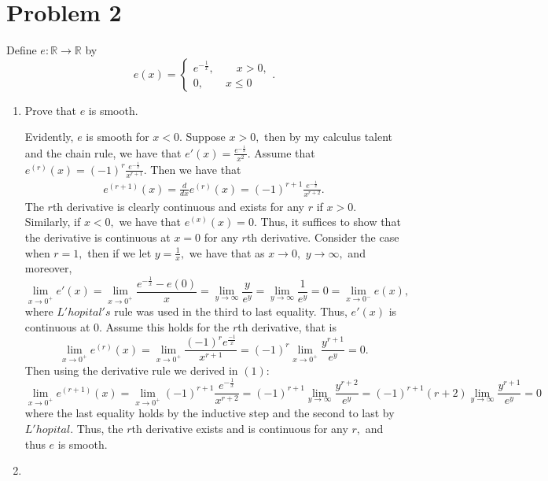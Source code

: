 \documentclass[11pt]{article}
\newcommand{\bbR}{\mathbb{R}}
\begin{document}
\newpage
\section*{Problem 2}
\begin{problem}
    Define $e: \bbR \to \bbR$ by 
    \[e(x) = \begin{cases}
        e^{-\frac{1}{x}}, \qquad x>0,\\
        0, \qquad x\leq 0
    \end{cases}.\]
\end{problem}
\begin{enumerate}
    \item Prove that $e$ is smooth.
    \begin{solution}
        Evidently, $e$ is smooth for $x<0.$ Suppose $x>0,$ then by my calculus talent and the chain rule, we have that $e'(x) = \frac{e^{-\frac{1}{x}}}{x^2}.$ Assume that $e^{(r)}(x) = (-1)^{r}\frac{e^{-\frac{1}{x}}}{x^{r+1}}.$ Then we have that \begin{align}
            e^{(r+1)}(x) = \frac{d}{dx}e^{(r)}(x) = (-1)^{r+1}\frac{e^{-\frac{1}{x}}}{x^{r+2}}.
        \end{align} The $r$th derivative is clearly continuous and exists for any $r$ if $x>0.$ Similarly, if $x<0,$ we have that $e^{(x)}(x) = 0.$ Thus, it suffices to show that the derivative is continuous at $x= 0$ for any $r$th derivative.
        Consider the case when $r = 1,$ then if we let $y = \frac{1}{x},$ we have that as $x\to 0,$ $y\to \infty,$ and moreover, \[\lim_{x\to 0^+}e'(x) = \lim_{x\to 0^+}\frac{e^{-\frac{1}{x}} - e(0)}{x} = \lim_{y\to \infty}\frac{y}{e^{y}} = \lim_{y\to \infty} \frac{1}{e^{y}} = 0= \lim_{x\to 0^-}e(x),\] where $L'hopital's$ rule was used in the third to last equality. Thus, $e'(x)$ is continuous at $0.$ Assume this holds for the $r$th derivative, that is 
        \[\lim_{x\to 0^+}e^{(r)}(x) = \lim_{x\to 0^+}\frac{(-1)^r e^{\frac{-1}{x}}}{x^{r+1}} = (-1)^r\lim_{x\to 0^+}\frac{y^{r+1}}{e^y} = 0.\] Then using the derivative rule we derived in $(1):$
        \[\lim_{x\to 0^+}e^{(r+1)}(x) = \lim_{x\to 0^+}(-1)^{r+1}\frac{e^{-\frac{1}{x}}}{x^{r+2}} = (-1)^{r+1}\lim_{y\to \infty}\frac{y^{r+2}}{e^y} = (-1)^{r+1}(r+2)\lim_{y\to \infty}\frac{y^{r+1}}{e^y} = 0\] where the last equality holds by the inductive step and the second to last by $L'hopital$. Thus, the $r$th derivative exists and is continuous for any $r,$ and thus $e$ is smooth.
    \end{solution}
    \item 
    \begin{problem}

\end{problem}
\end{enumerate}
\end{document}
